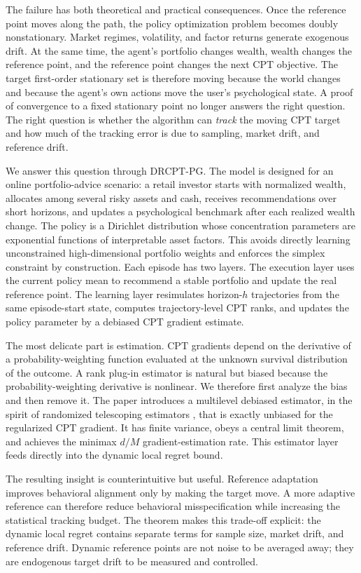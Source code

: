 \documentclass[11pt]{article}
\newcommand{\1}{\mathbf 1}
\newcommand{\CPT}{\ensuremath{\mathrm{CPT}}\xspace}
\newcommand{\DRCPTPG}{\ensuremath{\mathrm{DRCPT\mbox{-}PG}}\xspace}
\begin{document}
The failure has both theoretical and practical consequences.  Once the reference point moves along the path, the policy optimization problem becomes doubly nonstationary.  Market regimes, volatility, and factor returns generate exogenous drift.  At the same time, the agent's portfolio changes wealth, wealth changes the reference point, and the reference point changes the next \CPT objective.  The target first-order stationary set is therefore moving because the world changes and because the agent's own actions move the user's psychological state.  A proof of convergence to a fixed stationary point no longer answers the right question.  The right question is whether the algorithm can \emph{track} the moving \CPT target and how much of the tracking error is due to sampling, market drift, and reference drift.

We answer this question through \DRCPTPG.  The model is designed for an online portfolio-advice scenario: a retail investor starts with normalized wealth, allocates among several risky assets and cash, receives recommendations over short horizons, and updates a psychological benchmark after each realized wealth change.  The policy is a Dirichlet distribution whose concentration parameters are exponential functions of interpretable asset factors.  This avoids directly learning unconstrained high-dimensional portfolio weights and enforces the simplex constraint by construction.  Each episode has two layers.  The execution layer uses the current policy mean to recommend a stable portfolio and update the real reference point.  The learning layer resimulates horizon-$h$ trajectories from the same episode-start state, computes trajectory-level \CPT ranks, and updates the policy parameter by a debiased \CPT gradient estimate.

The most delicate part is estimation.  \CPT gradients depend on the derivative of a probability-weighting function evaluated at the unknown survival distribution of the outcome.  A rank plug-in estimator is natural but biased because the probability-weighting derivative is nonlinear.  We therefore first analyze the bias and then remove it.  The paper introduces a multilevel debiased estimator, in the spirit of randomized telescoping estimators \citep{rhee2015unbiased}, that is exactly unbiased for the regularized \CPT gradient.  It has finite variance, obeys a central limit theorem, and achieves the minimax $d/M$ gradient-estimation rate.  This estimator layer feeds directly into the dynamic local regret bound.

The resulting insight is counterintuitive but useful.  Reference adaptation improves behavioral alignment only by making the target move.  A more adaptive reference can therefore reduce behavioral misspecification while increasing the statistical tracking budget.  The theorem makes this trade-off explicit: the dynamic local regret contains separate terms for sample size, market drift, and reference drift.  Dynamic reference points are not noise to be averaged away; they are endogenous target drift to be measured and controlled.
\end{document}

